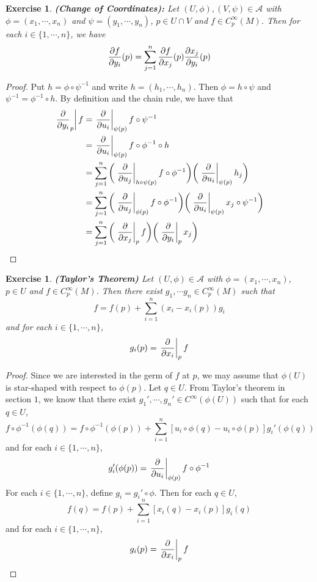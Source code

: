 \documentclass[12pt]{amsart}
\newtheorem{ex}[thm]{Exercise}
\newcommand{\MA}{\mathcal{A}}
\begin{document}
	\begin{ex} \textbf{(Change of Coordinates):}
		Let $(U, \phi), (V, \psi) \in \MA$ with $\phi = (x_1, \cdots, x_n)$ and $\psi = (y_1, \cdots, y_n)$, $p \in U \cap V$ and $f \in C_p^{\infty}(M)$. Then for each $i \in \{1, \cdots, n\}$, we have $${\pdv{f}{y_i}}(p) = \sum_{j =1}^n {\pdv{f}{x_j}}(p)   {\pdv{x_j}{y_i}}(p) $$
	\end{ex}

	\begin{proof}
		Put $h = \phi \circ \psi^{-1}$ and write $h = (h_1, \cdots, h_n)$. Then $\phi = h \circ \psi$ and $\psi^{-1} = \phi^{-1} \circ h$. By definition and the chain rule, we have that 
		\begin{align*}
		\eval{\pdv{y_i}_{p}} f 
			&= \eval{\pdv{u_i}}_{\psi(p)} f \circ \psi^{-1} \\
			&= \eval{\pdv{u_i}}_{\psi(p)} f \circ \phi^{-1} \circ h \\
			&= \sum_{j=1}^n \bigg( \eval{\pdv{u_j}}_{h \circ \psi (p)} f \circ \phi^{-1} \bigg)  \bigg( \eval{\pdv{u_i}}_{\psi(p)} h_j \bigg) \\
			&= \sum_{j=1}^n \bigg( \eval{\pdv{u_j}}_{\phi (p)} f \circ \phi^{-1}  \bigg) \bigg( \eval{\pdv{u_i}}_{\psi(p)} x_j \circ \psi^{-1} \bigg) \\
			&= \sum_{j=1}^n \bigg( \eval{\pdv{x_j}}_{p} f \bigg)  \bigg(   \eval{\pdv{y_i}}_{p} x_j  \bigg)\\
		\end{align*}
	\end{proof}

	\begin{ex}\textbf{(Taylor's Theorem)}
		Let $(U, \phi) \in \MA$ with $\phi = (x_1, \cdots, x_n)$, $p \in U$ and $f \in C^{\infty}_p(M)$. Then there exist $g_1, \cdots g_n \in C_p^{\infty}(M)$ such that $$f = f(p) + \sum_{i=1}^n(x_i - x_i(p)) g_i$$ and for each $i \in \{1, \cdots, n\}$, $$g_i(p) = \eval{\pdv{x_i}}_{p} f $$ 
	\end{ex}

	\begin{proof}
		Since we are interested in the germ of $f$ at $p$, we may assume that $\phi(U)$ is star-shaped with respect to $\phi(p)$. Let $q \in U$. From Taylor's theorem in section $1$, we know that there exist $g_1', \cdots, g_n' \in C^{\infty}(\phi(U))$ such that for each $q \in U$, $$f \circ \phi^{-1} (\phi(q)) = f \circ \phi^{-1} (\phi(p)) + \sum_{i = 1}^n [u_i \circ \phi(q) - u_i \circ \phi(p)] g_i' (\phi(q))$$ and for each $i \in \{1, \cdots, n\}$, $$g_i'(\phi(p)) = \eval{\pdv{u_i}}_{\phi(p)} f \circ \phi^{-1}$$ 
		For each $i \in \{1, \cdots, n\}$, define $g_i = g_i' \circ \phi$. Then for each $q \in U$, $$ f (q) = f (p) + \sum_{i = 1}^n [x_i(q) - x_i(p)] g_i(q)$$ and for each $i \in \{1, \cdots, n\}$, $$g_i(p) = \eval{\pdv{x_i}}_{p} f $$ 
	\end{proof}
\end{document}
